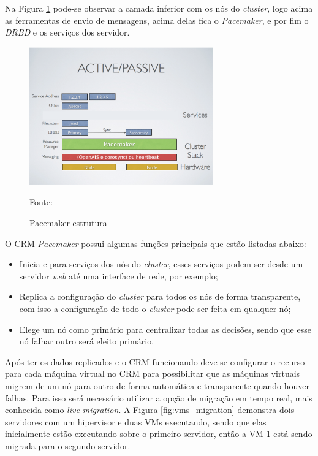 Na Figura \ref{fig:pacemaker_tools} pode-se observar a camada inferior com os nós do \textit{cluster}, logo acima as ferramentas de envio de 
mensagens, acima delas fica o \textit{Pacemaker}, e por fim o \textit{DRBD} e os serviços dos servidor.

\begin{figure}[h!]
 \centering
 \includegraphics[width=300px]{img/pacemaker_tools.eps}
 \caption{Pacemaker estrutura}
 Fonte: \citet{pacemaker}
 \label{fig:pacemaker_tools}
\end{figure}


O \ac{CRM} \textit{Pacemaker} possui algumas funções principais que estão listadas abaixo:
\begin{itemize}
 \item Inicia e para serviços dos nós do \textit{cluster}, esses serviços podem ser desde um servidor \textit{web} até uma interface de rede, 
 por exemplo;
 \item Replica a configuração do \textit{cluster} para todos os nós de forma transparente, com isso a configuração de todo o \textit{cluster} 
 pode ser feita em qualquer nó;
 \item Elege um nó como primário para centralizar todas as decisões, sendo que esse nó falhar outro será eleito primário.
\end{itemize}

Após ter os dados replicados e o \ac{CRM} funcionando deve-se configurar o recurso para cada máquina virtual no \ac{CRM} para possibilitar que as
máquinas virtuais migrem de um nó para outro de forma automática e transparente quando houver falhas. Para isso será necessário utilizar a 
opção de migração em tempo real, mais conhecida como \textit{live migration}.
A Figura \ref{fig:vms_migration} demonstra dois servidores com um hipervisor e duas \ac{VM}s executando, sendo que elas inicialmente estão 
executando sobre o primeiro servidor, então a \ac{VM} 1 está sendo migrada para o segundo servidor.

